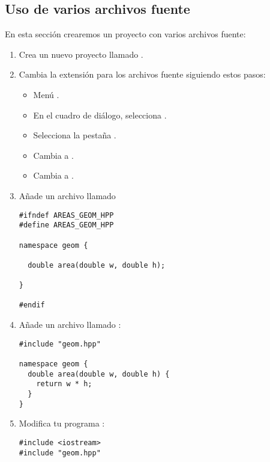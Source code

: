 \subsection{Uso de varios archivos fuente}

En esta sección crearemos un proyecto con varios archivos fuente:

\begin{enumerate}

\item
Crea un nuevo proyecto llamado .

\item
Cambia la extensión para los archivos fuente siguiendo estos pasos:
\begin{itemize}
  \item Menú .
  \item En el cuadro de diálogo, selecciona .
  \item Selecciona la pestaña .
  \item Cambia  a .
  \item Cambia  a .
\end{itemize}

\item
Añade un archivo llamado 

\begin{lstlisting}
#ifndef AREAS_GEOM_HPP
#define AREAS_GEOM_HPP

namespace geom {

  double area(double w, double h);

}

#endif
\end{lstlisting}

\item 
Añade un archivo llamado :

\begin{lstlisting}
#include "geom.hpp"

namespace geom {
  double area(double w, double h) {
    return w * h;
  }
}
\end{lstlisting}

\item
Modifica tu programa :

\begin{lstlisting}
#include <iostream>
#include "geom.hpp"


\end{lstlisting}
\end{enumerate}
